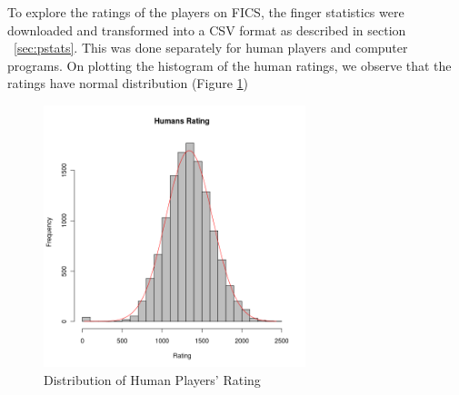 \documentclass{article}
\begin{document}
To explore the ratings of the players on FICS, the finger statistics were downloaded and transformed into a CSV format as described in section ~\ref{sec:pstats}. This was done separately for human players and computer programs. On plotting the histogram of the human ratings, we observe that the ratings have normal distribution (Figure \ref{fig:humanrating})

\begin{figure} [tph]
\begin{center}
\includegraphics[width=3in]{humans_rating.png}
\end{center}
\caption{Distribution of Human Players' Rating}
\label{fig:humanrating}
\end{figure}

\pagebreak


\end{document}
